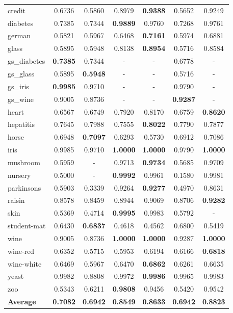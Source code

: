 \documentclass[11pt,a4paper]{article}
\begin{document}
\begin{longtable}{lcccccc}
credit & 0.6736 & 0.5860 & 0.8979 & \textbf{0.9388} & 0.5652 & 0.9249 \\
diabetes & 0.7385 & 0.7344 & \textbf{0.9889} & 0.9760 & 0.7268 & 0.9761 \\
german & 0.5821 & 0.5967 & 0.6468 & \textbf{0.7161} & 0.5974 & 0.6881 \\
glass & 0.5895 & 0.5948 & 0.8138 & \textbf{0.8954} & 0.5716 & 0.8584 \\
gs\_diabetes & \textbf{0.7385} & 0.7344 & - & - & 0.6778 & - \\
gs\_glass & 0.5895 & \textbf{0.5948} & - & - & 0.5716 & - \\
gs\_iris & \textbf{0.9985} & 0.9710 & - & - & 0.9790 & - \\
gs\_wine & 0.9005 & 0.8736 & - & - & \textbf{0.9287} & - \\
heart & 0.6567 & 0.6749 & 0.7920 & 0.8170 & 0.6759 & \textbf{0.8620} \\
hepatitis & 0.7645 & 0.7988 & 0.7555 & \textbf{0.8022} & 0.7790 & 0.7877 \\
horse & 0.6948 & \textbf{0.7097} & 0.6293 & 0.5730 & 0.6912 & 0.7086 \\
iris & 0.9985 & 0.9710 & \textbf{1.0000} & \textbf{1.0000} & 0.9790 & \textbf{1.0000} \\
mushroom & 0.5959 & - & 0.9713 & \textbf{0.9734} & 0.5685 & 0.9709 \\
nursery & 0.5000 & - & \textbf{0.9992} & 0.9961 & 0.1580 & 0.9981 \\
parkinsons & 0.5903 & 0.3339 & 0.9264 & \textbf{0.9277} & 0.4970 & 0.8631 \\
raisin & 0.8578 & 0.8459 & 0.8944 & 0.9069 & 0.8706 & \textbf{0.9282} \\
skin & 0.5369 & 0.4714 & \textbf{0.9995} & 0.9983 & 0.5792 & - \\
student-mat & 0.6430 & \textbf{0.6837} & 0.4618 & 0.4562 & 0.6800 & 0.5419 \\
wine & 0.9005 & 0.8736 & \textbf{1.0000} & \textbf{1.0000} & 0.9287 & \textbf{1.0000} \\
wine-red & 0.6352 & 0.5715 & 0.5953 & 0.6194 & 0.6166 & \textbf{0.6818} \\
wine-white & 0.6469 & 0.5967 & 0.6470 & \textbf{0.6862} & 0.6261 & 0.6635 \\
yeast & 0.9982 & 0.8808 & 0.9972 & \textbf{0.9986} & 0.9965 & 0.9983 \\
zoo & 0.5343 & 0.6211 & \textbf{0.9808} & 0.9456 & 0.5420 & 0.9542 \\
\midrule \textbf{Average} & \textbf{0.7082} & \textbf{0.6942} & \textbf{0.8549} & \textbf{0.8633} & \textbf{0.6942} & \textbf{0.8823} \\
\bottomrule\end{longtable}
\end{document}
